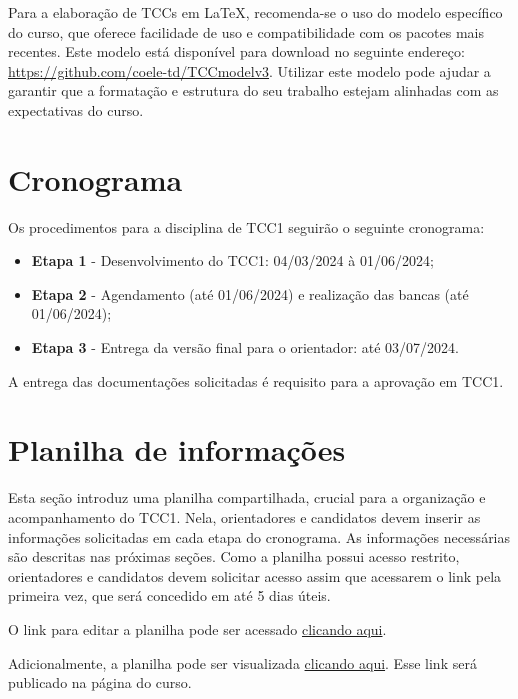 \documentclass[a4paper, 12pt]{article}
\newcommand{\startdate}{04/03/2024}		%
\newcommand{\agendadate}{01/06/2024}	%
\newcommand{\finaldate}{03/07/2024}		%
\begin{document}
	Para a elaboração de TCCs em \LaTeX{}, recomenda-se o uso do modelo específico do curso, que oferece facilidade de uso e compatibilidade com os pacotes mais recentes. Este modelo está disponível para download no seguinte endereço: \url{https://github.com/coele-td/TCCmodelv3}. Utilizar este modelo pode ajudar a garantir que a formatação e estrutura do seu trabalho estejam alinhadas com as expectativas do curso.


    \section{Cronograma}
    \label{sec:CRO}
    
    Os procedimentos para a disciplina de TCC1 seguirão o seguinte cronograma:
    \begin{itemize}
    	\item \textbf{Etapa 1} - Desenvolvimento do TCC1: \startdate{} à \agendadate;
    	\item \textbf{Etapa 2} - Agendamento (até \agendadate) e realização das bancas (até \agendadate);
    	\item \textbf{Etapa 3} - Entrega da versão final para o orientador: até \finaldate.    	
    \end{itemize}

	A entrega das documentações solicitadas é requisito para a aprovação em TCC1.

	\section{Planilha de informações}
	\label{sec:pla}
	Esta seção introduz uma planilha compartilhada, crucial para a organização e acompanhamento do TCC1. Nela, orientadores e candidatos devem inserir as informações solicitadas em cada etapa do cronograma. As informações necessárias são descritas nas próximas seções. Como a planilha possui acesso restrito, orientadores e candidatos devem solicitar acesso assim que acessarem o link pela primeira vez, que será concedido em até 5 dias úteis.
	
	O link para editar a planilha pode ser acessado \href{https://docs.google.com/spreadsheets/d/1AfsG1P6wrw42CbZCDbQzsXFXmxfrMmZ7gpn8NvR8cq4/edit?usp=sharing}{clicando aqui}.
	
	Adicionalmente, a planilha pode ser visualizada \href{https://docs.google.com/spreadsheets/d/e/2PACX-1vQKQ_bI1Ka_BKbx_LZkVxxYrV69ROWFWqE8V_niYUJP7EjumnNhUP65tGiUxh32qgDYW_WWdC5nJelJ/pubhtml}{clicando aqui}. Esse link será publicado na página do curso.
\end{document}
